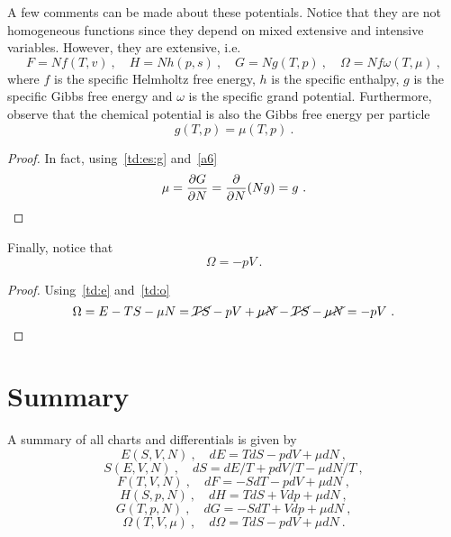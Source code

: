     A few comments can be made about these potentials. Notice that  they are not homogeneous functions since they depend on mixed extensive and intensive variables. However, they are extensive, i.e. 
    \begin{equation}\label{a6}
        F = N f(T, v) ~, \quad H = N h(p, s) ~, \quad G = N g(T, p) ~, \quad \Omega = N f \omega (T, \mu) ~,
    \end{equation}
    where $f$ is the specific Helmholtz free energy, $h$ is the specific enthalpy, $g$ is the specific Gibbs free energy and $\omega$ is the specific grand potential. Furthermore, observe that the chemical potential is also the Gibbs free energy per particle
    \begin{equation}
        g(T, p) = \mu(T, p) ~.
    \end{equation}
    \begin{proof}
        In fact, using~\eqref{td:es:g} and~\eqref{a6}
        \begin{equation*}
            \mu = \frac{\partial G}{\partial N} = \frac{\partial}{\partial N}(Ng) = g ~.
        \end{equation*}
    \end{proof}
    Finally, notice that 
    \begin{equation}\label{td:o2}
        \Omega = - pV ~.
    \end{equation}
    \begin{proof}
        Using~\eqref{td:e} and~\eqref{td:o}
        \begin{equation*}
            \Omega = E - TS - \mu N = \cancel{TS} - pV + \cancel{\mu N} - \cancel{TS} - \cancel{\mu N} = - pV ~.
        \end{equation*}
    \end{proof}

\section{Summary}

    A summary of all charts and differentials is given by 
    \begin{equation*}
        E(S, V, N) ~, \quad dE = TdS - p dV + \mu dN ~,
    \end{equation*}
    \begin{equation*}
        S(E, V, N) ~, \quad dS = dE/T + p dV/T - \mu dN/T ~,
    \end{equation*}
    \begin{equation*}
        F(T, V, N) ~, \quad dF = - S dT - p dV + \mu dN ~,
    \end{equation*}
    \begin{equation*}
        H(S, p, N) ~, \quad dH = TdS + V dp + \mu dN ~,
    \end{equation*}
    \begin{equation*}
        G(T, p, N) ~, \quad d G = - SdT + V dp + \mu dN ~,
    \end{equation*}
    \begin{equation*}
        \Omega(T, V, \mu) ~, \quad d\Omega = TdS - p dV + \mu dN ~.
    \end{equation*}

